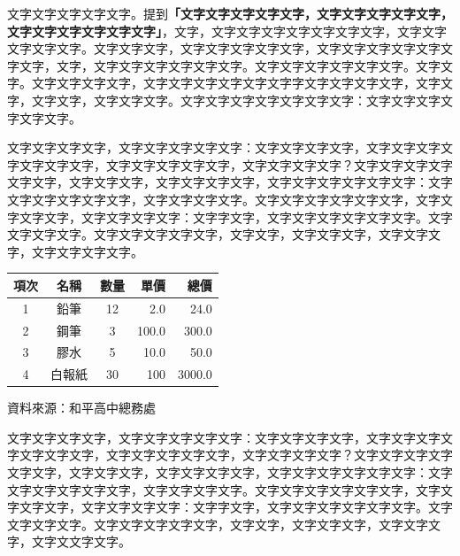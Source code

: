 \documentclass[12pt]{article}
\begin{document}
文字文字文字文字文字。\textcite{fowles}提到\textbf{「文字文字文字文字文字，文字文字文字文字文字，文字文字文字文字文字文字」}，文字，文字文字文字文字文字文字文字，文字文字文字文字文字。文字文字文字，文字文字文字文字文字，文字文字文字文字文字文字文字，文字，文字文字文字文字文字文字。文字文字文字文字文字文字。文字文字。文字文字文字文字，文字文字文字文字文字文字字文字文字文字文字，文字文字，文字文字，文字文字文字。文字文字文字文字文字文字文字：文字文字文字文字文字文字。

文字文字文字文字，文字文字文字文字文字：文字文字文字文字，文字文字文字文字文字文字文字，文字文字文字文字文字，文字文字文字文字？文字文字文字文字文字文字，文字文字文字，文字文字文字文字，文字文字文字文字文字文字：文字文字文字文字文字文字，文字文字文字文字。文字文字文字文字文字文字，文字文字文字文字，文字文字文字文字：文字字文字，文字文字文字文字文字文字。文字文字文字文字。文字文字文字文字文字，文字文字，文字文字文字，文字文字文字，文字文字文字文字\cite{ter1971}。


{
\begin{tabular}{cccrr}
\toprule
項次 & 名稱 & 數量 & 單價 & 總價 \\
\midrule
1 & 鉛筆  & 12 & 2.0 & 24.0 \\
2 & 鋼筆 & 3 & 100.0& 300.0 \\
3 & 膠水 & 5 & 10.0 & 50.0 \\
4 & 白報紙 & 30 & 100 & 3000.0\\
\bottomrule
\end{tabular}}
{資料來源：和平高中總務處}



文字文字文字文字，文字文字文字文字文字：文字文字文字文字，文字文字文字文字文字文字文字，文字文字文字文字文字，文字文字文字文字？文字文字文字文字文字文字，文字文字文字，文字文字文字文字，文字文字文字文字文字文字：文字文字文字文字文字文字，文字文字文字文字。文字文字文字文字文字文字，文字文字文字文字，文字文字文字文字：文字字文字，文字文字文字文字文字文字。文字文字文字文字。文字文字文字文字文字，文字文字，文字文字文字，文字文字文字，文字文文字文字\autocite{dirac}。





\printbibliography[title={陸、參考資料}]
\end{document}

